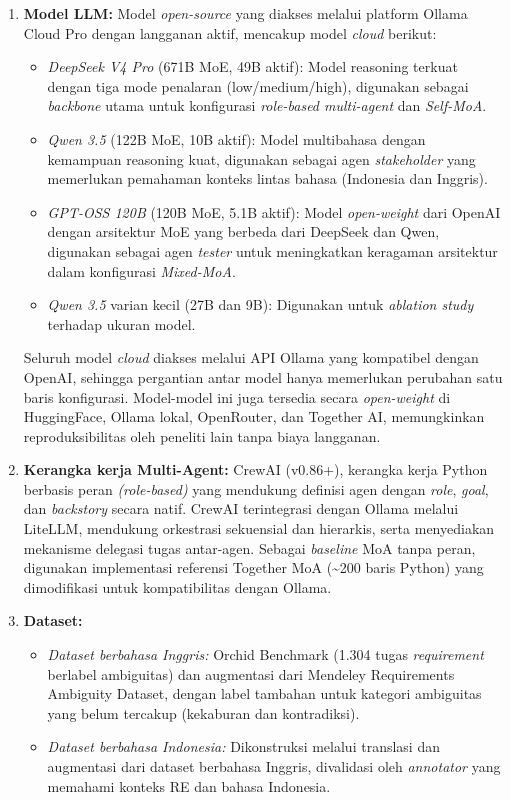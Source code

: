 \begin{enumerate}
	\item \textbf{Model LLM:} Model \textit{open-source} yang diakses melalui platform Ollama Cloud Pro dengan langganan aktif, mencakup model \textit{cloud} berikut:
	\begin{itemize}
		\item \textit{DeepSeek V4 Pro} (671B MoE, 49B aktif): Model reasoning terkuat dengan tiga mode penalaran (low/medium/high), digunakan sebagai \textit{backbone} utama untuk konfigurasi \textit{role-based multi-agent} dan \textit{Self-MoA}.
		\item \textit{Qwen 3.5} (122B MoE, 10B aktif): Model multibahasa dengan kemampuan reasoning kuat, digunakan sebagai agen \textit{stakeholder} yang memerlukan pemahaman konteks lintas bahasa (Indonesia dan Inggris).
		\item \textit{GPT-OSS 120B} (120B MoE, 5.1B aktif): Model \textit{open-weight} dari OpenAI dengan arsitektur MoE yang berbeda dari DeepSeek dan Qwen, digunakan sebagai agen \textit{tester} untuk meningkatkan keragaman arsitektur dalam konfigurasi \textit{Mixed-MoA}.
		\item \textit{Qwen 3.5} varian kecil (27B dan 9B): Digunakan untuk \textit{ablation study} terhadap ukuran model.
	\end{itemize}
	Seluruh model \textit{cloud} diakses melalui API Ollama yang kompatibel dengan OpenAI, sehingga pergantian antar model hanya memerlukan perubahan satu baris konfigurasi. Model-model ini juga tersedia secara \textit{open-weight} di HuggingFace, Ollama lokal, OpenRouter, dan Together AI, memungkinkan reproduksibilitas oleh peneliti lain tanpa biaya langganan.

	\item \textbf{Kerangka kerja Multi-Agent:} CrewAI (v0.86+), kerangka kerja Python berbasis peran \textit{(role-based)} yang mendukung definisi agen dengan \textit{role}, \textit{goal}, dan \textit{backstory} secara natif. CrewAI terintegrasi dengan Ollama melalui LiteLLM, mendukung orkestrasi sekuensial dan hierarkis, serta menyediakan mekanisme delegasi tugas antar-agen. Sebagai \textit{baseline} MoA tanpa peran, digunakan implementasi referensi Together MoA (\textasciitilde200 baris Python) yang dimodifikasi untuk kompatibilitas dengan Ollama.

	\item \textbf{Dataset:}
	\begin{itemize}
		\item \textit{Dataset berbahasa Inggris:} Orchid Benchmark (1.304 tugas \textit{requirement} berlabel ambiguitas) dan augmentasi dari Mendeley Requirements Ambiguity Dataset, dengan label tambahan untuk kategori ambiguitas yang belum tercakup (kekaburan dan kontradiksi).
		\item \textit{Dataset berbahasa Indonesia:} Dikonstruksi melalui translasi dan augmentasi dari dataset berbahasa Inggris, divalidasi oleh \textit{annotator} yang memahami konteks RE dan bahasa Indonesia.
	\end{itemize}


\end{enumerate}
